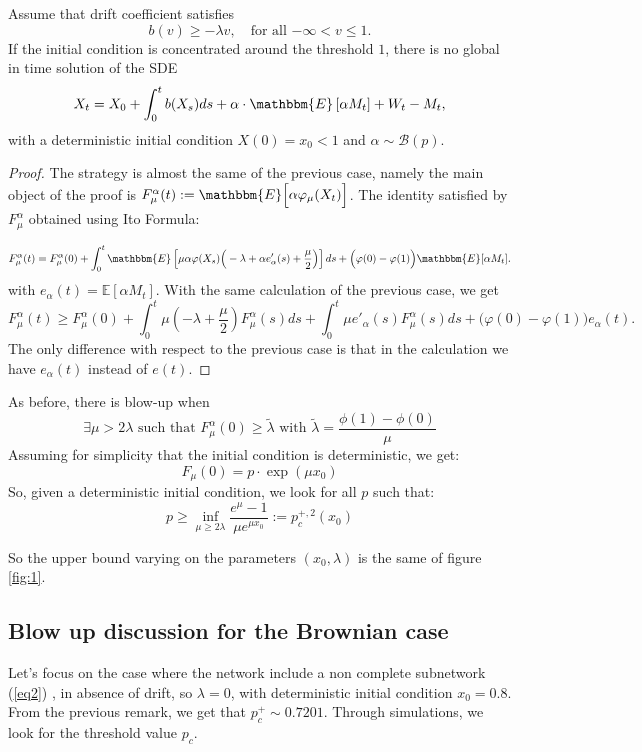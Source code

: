 \begin{theorem}
Assume that drift coefficient satisfies
\[b(v) \geq -\lambda v, \quad \text{for all $-\infty<v\leq1$.}\]
If the initial condition is concentrated around the threshold $1$, there is no global in time solution of the SDE
\begin{equation} \label{limit1} X_t = X_0 + \int_0^t b(X_s) ds + \alpha  \cdot \mathbbm{E} \left[ \alpha M_t \right] + W_t - M_t, \end{equation}
with a deterministic initial condition $X(0) = x_0 < 1$ and $\alpha\sim\mathcal{B}(p)$.
\end{theorem}
\begin{proof}
The strategy is almost the same of the previous case, namely the main object of the proof is 
$F^\alpha_\mu(t) := \mathbbm{E} \Big[ \alpha \varphi_\mu (X_t) \Big]$. The identity satisfied by $F^\alpha_\mu$ obtained using Ito Formula:

\[ F^\alpha_\mu(t) = F^\alpha_\mu(0) + \int_0^t \mathbbm{E} \left[ \mu \alpha \varphi(X_s) \Big( -\lambda + \alpha e_\alpha'(s) + \frac{\mu}{2} \Big) \right] ds + \Big( \varphi(0) - \varphi(1) \Big) \mathbbm{E}[\alpha M_t]. \]
with $e_\alpha(t)=\mathbb{E}[\alpha M_t]$. With the same calculation of the previous case, we get
\begin{equation*} 
\label{starting} F^\alpha_\mu(t) \geq F^\alpha_\mu(0) + \int_0^t \mu \left( - \lambda + \frac{\mu}{2} \right) F^\alpha_\mu(s) ds + \int_0^t \mu e'_\alpha(s) F^\alpha_\mu(s) ds + \Big( \varphi(0) - \varphi(1) \Big) e_\alpha(t).
 \end{equation*}
 The only difference with respect to the previous case is that in the calculation we have $e_\alpha(t)$ instead of $e(t)$.
\end{proof}
\begin{remark}
As before, there is blow-up when
\[\exists \mu>2\lambda\text{ such that }F^\alpha_\mu(0)\geq \tilde{\lambda}\text{ with }\tilde{\lambda}=\frac{\phi(1)-\phi(0)}{\mu } \]
Assuming for simplicity that the initial condition is deterministic, we get:
\[F_\mu(0)=p\cdot\exp(\mu x_0)\]
So, given a deterministic initial condition, we look for all $p$ such that:
\[p\geq \inf_{\mu\geq 2\lambda}\frac{e^\mu-1}{\mu e^{\mu x_0}}:=p^{+,2}_c(x_0)\]

So the upper bound varying on the parameters $(x_0,\lambda)$ is the same of figure \ref{fig:1}.
\end{remark}

\subsection{Blow up discussion for the Brownian case}
Let's focus on the case where the network include a non complete subnetwork  (\ref{eq2}) , in absence of drift, so $\lambda=0$, with deterministic initial condition $x_0=0.8$. From the previous remark, we get that $p^+_c\sim 0.7201$. Through simulations, we look for the threshold value $p_c$.\\


